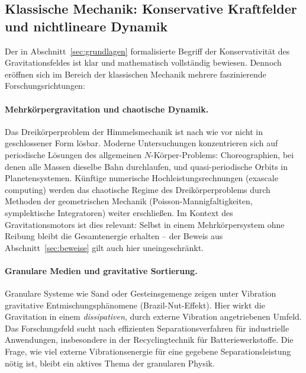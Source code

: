 ﻿\documentclass[12pt, a4paper]{report}
\theoremstyle{definition}
\theoremstyle{remark}
\begin{document}
\subsection{Klassische Mechanik: Konservative Kraftfelder und nichtlineare
               Dynamik}

Der in Abschnitt~\ref{sec:grundlagen} formalisierte Begriff der Konservativität
des Gravitationsfeldes ist klar und mathematisch vollständig bewiesen.
Dennoch eröffnen sich im Bereich der klassischen Mechanik mehrere faszinierende
Forschungsrichtungen:

\paragraph{Mehrkörpergravitation und chaotische Dynamik.}
Das Dreikörperproblem der Himmelsmechanik ist nach wie vor nicht in
geschlossener Form lösbar. Moderne Untersuchungen konzentrieren sich auf
periodische Lösungen des allgemeinen $N$-Körper-Problems: Choreographien,
bei denen alle Massen dieselbe Bahn durchlaufen, und quasi-periodische
Orbits in Planetensystemen. Künftige numerische Hochleistungsrechnungen
(exascale computing) werden das chaotische Regime des Dreikörperproblems
durch Methoden der geometrischen Mechanik (Poisson-Mannigfaltigkeiten,
symplektische Integratoren) weiter erschließen. Im Kontext des
Gravitationsmotors ist dies relevant: Selbst in einem Mehrkörpersystem
ohne Reibung bleibt die Gesamtenergie erhalten -- der Beweis aus
Abschnitt~\ref{sec:beweise} gilt auch hier uneingeschränkt.

\paragraph{Granulare Medien und gravitative Sortierung.}
Granulare Systeme wie Sand oder Gesteinsgemenge zeigen unter Vibration
gravitative Entmischungsphänomene (Brazil-Nut-Effekt). Hier wirkt die
Gravitation in einem \emph{dissipativen}, durch externe Vibration
angetriebenen Umfeld. Das Forschungsfeld sucht nach effizienten
Separationsverfahren für industrielle Anwendungen, insbesondere in der
Recyclingtechnik für Batteriewerkstoffe. Die Frage, wie viel externe
Vibrationsenergie für eine gegebene Separationsleistung nötig ist, bleibt
ein aktives Thema der granularen Physik.
\end{document}
